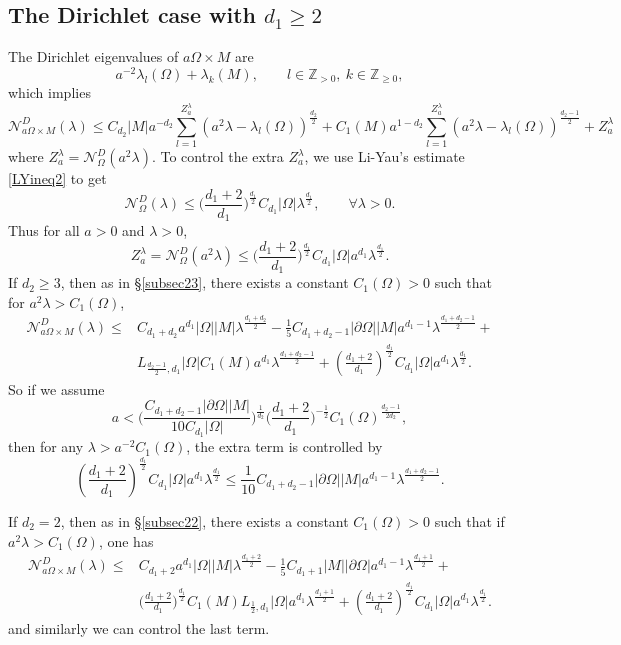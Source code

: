 \documentclass[11pt,letterpaper]{amsart}
\numberwithin{equation}{section}
\theoremstyle{plain}
\theoremstyle{plain}
\numberwithin{equation}{section}
\theoremstyle{remark}
\begin{document}
	\subsection{The Dirichlet case with $d_1\ge 2$}\label{mfld23}
	
	The Dirichlet eigenvalues of $a\Omega\times M$ are 
	\[
	a^{-2}\lambda_l(\Omega)+ \lambda_k(M),\qquad l\in \mathbb Z_{>0},\ k\in \mathbb Z_{\ge 0},
	\]
	which implies  
	\[ \mathcal N^D_{a\Omega\times M}(\lambda) 
	\le C_{d_2}|M|a^{-d_2} \sum_{l=1}^{Z^\lambda_a} (a^2\lambda- \lambda_l(\Omega))^{\frac{d_2}{2}}+ C_1(M)a^{1-d_2} \sum_{l=1}^{Z^\lambda_a} (a^2\lambda- \lambda_l(\Omega))^{\frac{d_2-1}{2}}+ Z^\lambda_a
	\]
	where $Z^\lambda_a= \mathcal N^D_\Omega(a^2\lambda)$. To control the extra $Z^\lambda_a$, we use Li-Yau's estimate  \eqref{LYineq2} to get 
	\[
	\mathcal N^D_\Omega(\lambda)\le \big(\frac{d_1+2}{d_1}\big)^{\frac{d_1}{2}} C_{d_1}|\Omega| \lambda^{\frac{d_1}{2}}, \qquad \forall \lambda>0.
	\]
	Thus for all $a>0$ and $\lambda>0$,
	\[
	Z^\lambda_a= \mathcal N^D_\Omega(a^2\lambda) \le \big(\frac{d_1+2}{d_1}\big)^{\frac{d_1}{2}} C_{d_1}|\Omega| a^{d_1}\lambda^{\frac{d_1}{2}}.
	\]
	If $d_2 \ge 3$, then as in \S\ref{subsec23}, there exists a constant $C_1(\Omega)>0$ such that for $a^2\lambda> C_1(\Omega)$,  
	\[
	\begin{aligned}
		\mathcal N^D_{a\Omega\times M}(\lambda) 
		\le&C_{d_1+d_2}a^{d_1}|\Omega||M|\lambda^{\frac{d_1+d_2}{2}}-\frac{1}{5} C_{d_1+d_2-1}|\partial \Omega||M|a^{d_1-1}\lambda^{\frac{d_1+d_2-1}{2}}+\\
		&L_{\frac{d_2-1}{2},d_1}|\Omega| C_1(M)a^{d_1}\lambda^{\frac{d_1+d_2-1}{2}}+ (\frac{d_1+2}{d_1})^{\frac{d_1}{2}}C_{d_1}|\Omega|a^{d_1}\lambda^{\frac{d_1}{2}}.
	\end{aligned}
	\]
	So if we assume 
	\[
	a<\big(\frac{ C_{d_1+d_2-1}|\partial \Omega||M|}{10 C_{d_1}|\Omega|}\big)^{\frac{1}{d_2}} \big(\frac{d_1+2}{d_1}\big)^{-\frac{1}{2}} C_1(\Omega)^{\frac{d_2-1}{2d_2}},
	\]
	then for any $\lambda> a^{-2}C_1(\Omega)$, the extra term is controlled by 
	\[
	(\frac{d_1+2}{d_1})^{\frac{d_1}{2}}C_{d_1}|\Omega|a^{d_1}\lambda^{\frac{d_1}{2}}\le \frac{1}{10}C_{d_1+d_2-1}|\partial \Omega||M|a^{d_1-1}\lambda^{\frac{d_1+d_2-1}{2}}.
	\]
	
	If $d_2=2$, then as in \S\ref{subsec22}, there exists a constant $C_1(\Omega)>0$ such that if $a^2\lambda> C_1(\Omega)$, one has
	\[
	\begin{aligned}
		\mathcal N^D_{a\Omega\times M}(\lambda) 
		\le&C_{d_1+2}a^{d_1}|\Omega||M|\lambda^{\frac{d_1+2}{2}}-\frac{1}{5}C_{d_1+1}|M||\partial \Omega|a^{d_1-1}\lambda^{\frac{d_1+1}{2}}+\\
		&\big(\frac{d_1+2}{d_1}\big)^{\frac{d_1}{2}} C_1(M)L_{\frac{1}{2}, d_1}|\Omega|a^{d_1}\lambda^{\frac{d_1+1}{2}}+(\frac{d_1+2}{d_1})^{\frac{d_1}{2}}C_{d_1}|\Omega|a^{d_1}\lambda^{\frac{d_1}{2}}.
	\end{aligned}
	\]
	and similarly we can control the last term. 
	
\end{document}
